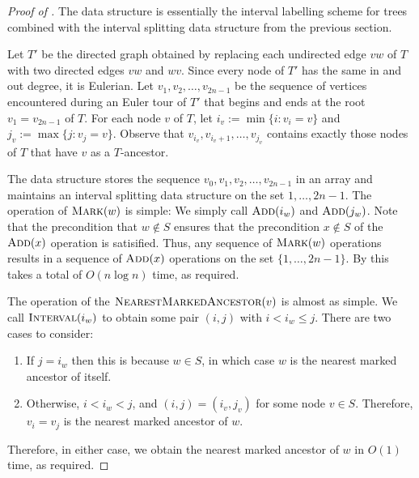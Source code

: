 \documentclass[kpfonts]{patmorin}
\let\le\leqslant
\begin{document}
\begin{proof}[Proof of ]
    The data structure is essentially the interval labelling scheme for trees combined with the interval splitting data structure from the previous section.

    Let $T'$ be the directed graph obtained by replacing each undirected edge $vw$ of $T$ with two directed edges $vw$ and $wv$.  Since every node of $T'$ has the same in and out degree, it is Eulerian.  Let $v_1,v_2,\ldots,v_{2n-1}$ be the sequence of vertices encountered during an Euler tour of $T'$ that begins and ends at the root $v_1=v_{2n-1}$ of $T$.
    For each node $v$ of $T$, let $i_v:=\min\{i:v_i=v\}$ and $j_v:=\max\{j:v_j=v\}$. Observe that $v_{i_v},v_{i_v+1},\ldots,v_{j_v}$ contains exactly those nodes of $T$ that have $v$ as a $T$-ancestor.

    The data structure stores the sequence $v_0,v_1,v_2,\ldots,v_{2n-1}$ in an array and maintains an interval splitting data structure on the set $1,\ldots,2n-1$.  The operation of $\textsc{Mark}(w)$ is simple: We simply call $\textsc{Add}(i_w)$ and $\textsc{Add}(j_w)$.  Note that the precondition that $w\not\in S$ ensures that the precondition $x\not\in S$ of the $\textsc{Add}(x)$ operation is satisified.  Thus, any sequence of $\textsc{Mark}(w)$ operations results in a sequence of $\textsc{Add}(x)$ operations on the set $\{1,\ldots,2n-1\}$.  By  this takes a total of $O(n\log n)$ time, as required.

    The operation of the $\textsc{NearestMarkedAncestor}(v)$ is almost as simple.  We call $\textsc{Interval}(i_w)$ to obtain some pair $(i,j)$ with $i< i_w \le j$.  There are two cases to consider:
    \begin{enumerate}
        \item If $j=i_w$ then this is because $w\in S$, in which case $w$ is the nearest marked ancestor of itself.
        \item Otherwise, $i<i_w<j$, and $(i,j)=(i_v,j_v)$ for some node $v\in S$.  Therefore, $v_{i}=v_{j}$ is the nearest marked ancestor of $w$.
    \end{enumerate}
    Therefore, in either case, we obtain the nearest marked ancestor of $w$ in $O(1)$ time, as required.
\end{proof}
\end{document}
